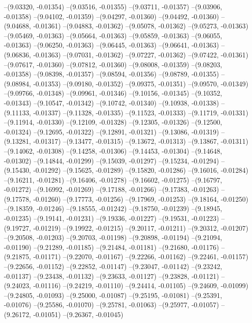 --(9.03320, -0.01354)
--(9.03516, -0.01355)
--(9.03711, -0.01357)
--(9.03906, -0.01358)
--(9.04102, -0.01359)
--(9.04297, -0.01360)
--(9.04492, -0.01360)
--(9.04688, -0.01361)
--(9.04883, -0.01362)
--(9.05078, -0.01362)
--(9.05273, -0.01363)
--(9.05469, -0.01363)
--(9.05664, -0.01363)
--(9.05859, -0.01363)
--(9.06055, -0.01363)
--(9.06250, -0.01363)
--(9.06445, -0.01363)
--(9.06641, -0.01363)
--(9.06836, -0.01363)
--(9.07031, -0.01362)
--(9.07227, -0.01362)
--(9.07422, -0.01361)
--(9.07617, -0.01360)
--(9.07812, -0.01360)
--(9.08008, -0.01359)
--(9.08203, -0.01358)
--(9.08398, -0.01357)
--(9.08594, -0.01356)
--(9.08789, -0.01355)
--(9.08984, -0.01353)
--(9.09180, -0.01352)
--(9.09375, -0.01351)
--(9.09570, -0.01349)
--(9.09766, -0.01348)
--(9.09961, -0.01346)
--(9.10156, -0.01345)
--(9.10352, -0.01343)
--(9.10547, -0.01342)
--(9.10742, -0.01340)
--(9.10938, -0.01338)
--(9.11133, -0.01337)
--(9.11328, -0.01335)
--(9.11523, -0.01333)
--(9.11719, -0.01331)
--(9.11914, -0.01330)
--(9.12109, -0.01328)
--(9.12305, -0.01326)
--(9.12500, -0.01324)
--(9.12695, -0.01322)
--(9.12891, -0.01321)
--(9.13086, -0.01319)
--(9.13281, -0.01317)
--(9.13477, -0.01315)
--(9.13672, -0.01313)
--(9.13867, -0.01311)
--(9.14062, -0.01308)
--(9.14258, -0.01306)
--(9.14453, -0.01304)
--(9.14648, -0.01302)
--(9.14844, -0.01299)
--(9.15039, -0.01297)
--(9.15234, -0.01294)
--(9.15430, -0.01292)
--(9.15625, -0.01289)
--(9.15820, -0.01286)
--(9.16016, -0.01284)
--(9.16211, -0.01281)
--(9.16406, -0.01278)
--(9.16602, -0.01275)
--(9.16797, -0.01272)
--(9.16992, -0.01269)
--(9.17188, -0.01266)
--(9.17383, -0.01263)
--(9.17578, -0.01260)
--(9.17773, -0.01256)
--(9.17969, -0.01253)
--(9.18164, -0.01250)
--(9.18359, -0.01246)
--(9.18555, -0.01242)
--(9.18750, -0.01239)
--(9.18945, -0.01235)
--(9.19141, -0.01231)
--(9.19336, -0.01227)
--(9.19531, -0.01223)
--(9.19727, -0.01219)
--(9.19922, -0.01215)
--(9.20117, -0.01211)
--(9.20312, -0.01207)
--(9.20508, -0.01203)
--(9.20703, -0.01198)
--(9.20898, -0.01194)
--(9.21094, -0.01190)
--(9.21289, -0.01185)
--(9.21484, -0.01181)
--(9.21680, -0.01176)
--(9.21875, -0.01171)
--(9.22070, -0.01167)
--(9.22266, -0.01162)
--(9.22461, -0.01157)
--(9.22656, -0.01152)
--(9.22852, -0.01147)
--(9.23047, -0.01142)
--(9.23242, -0.01137)
--(9.23438, -0.01132)
--(9.23633, -0.01127)
--(9.23828, -0.01121)
--(9.24023, -0.01116)
--(9.24219, -0.01110)
--(9.24414, -0.01105)
--(9.24609, -0.01099)
--(9.24805, -0.01093)
--(9.25000, -0.01087)
--(9.25195, -0.01081)
--(9.25391, -0.01076)
--(9.25586, -0.01070)
--(9.25781, -0.01063)
--(9.25977, -0.01057)
--(9.26172, -0.01051)
--(9.26367, -0.01045)

